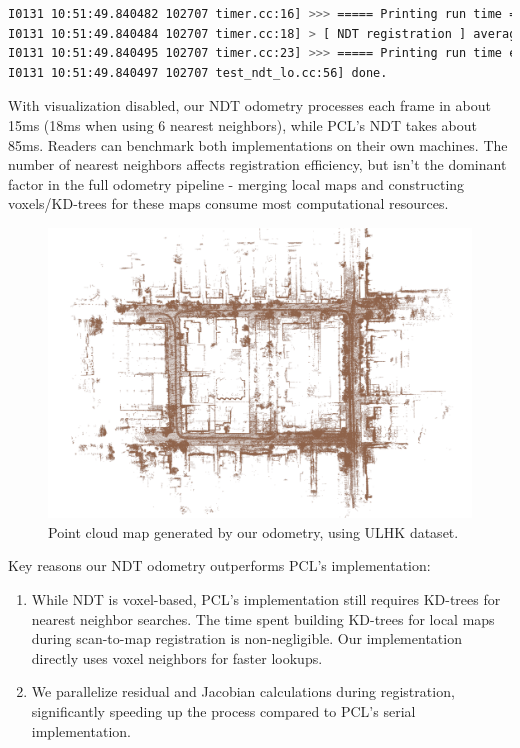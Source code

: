 \begin{lstlisting}[language=sh,caption=Terminal output:]
I0131 10:51:49.840482 102707 timer.cc:16] >>> ===== Printing run time =====
I0131 10:51:49.840484 102707 timer.cc:18] > [ NDT registration ] average time usage: 36.349 ms , called times: 3178
I0131 10:51:49.840495 102707 timer.cc:23] >>> ===== Printing run time end =====
I0131 10:51:49.840497 102707 test_ndt_lo.cc:56] done.
\end{lstlisting}

With visualization disabled, our NDT odometry processes each frame in about 15ms (18ms when using 6 nearest neighbors), while PCL's NDT takes about 85ms. Readers can benchmark both implementations on their own machines. The number of nearest neighbors affects registration efficiency, but isn't the dominant factor in the full odometry pipeline - merging local maps and constructing voxels/KD-trees for these maps consume most computational resources.

\begin{figure}[!t]
	\centering
	\includegraphics[width=1.0\textwidth]{resources/3d-lidar-mapping/ch7-lo-map}
	\caption{Point cloud map generated by our odometry, using ULHK dataset.}
	\label{fig:lo-map}
\end{figure}

Key reasons our NDT odometry outperforms PCL's implementation:
\begin{enumerate}
	\item While NDT is voxel-based, PCL's implementation still requires KD-trees for nearest neighbor searches. The time spent building KD-trees for local maps during scan-to-map registration is non-negligible. Our implementation directly uses voxel neighbors for faster lookups.
	\item We parallelize residual and Jacobian calculations during registration, significantly speeding up the process compared to PCL's serial implementation.
\end{enumerate}

